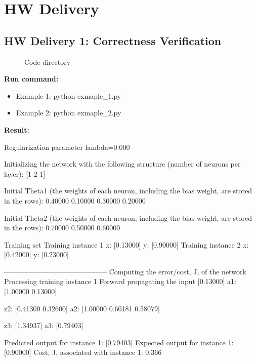 \documentclass{article}
\begin{document}
\newpage
\section*{HW Delivery}

\subsection*{HW Delivery 1: Correctness Verification}

\begin{figure}[htbp]
\centering
\begin{minipage}{0.95\linewidth}

\end{minipage}
\caption{Code directory}
\label{fig:filetree}
\end{figure}


\noindent \textbf{Run command:}
\begin{itemize}
    \item Example 1: python exmaple\_1.py
    \item Example 2: python exmaple\_2.py
\end{itemize}

\noindent \textbf{Result:}

\noindent {}

Regularization parameter lambda=0.000

Initializing the network with the following structure (number of neurons per layer): [1 2 1]

Initial Theta1 (the weights of each neuron, including the bias weight, are stored in the rows):
0.40000  0.10000
0.30000  0.20000

Initial Theta2 (the weights of each neuron, including the bias weight, are stored in the rows):
0.70000  0.50000  0.60000

Training set
Training instance 1
x: [0.13000]
y: [0.90000]
Training instance 2
x: [0.42000]
y: [0.23000]

--------------------------------------------
Computing the error/cost, J, of the network
Processing training instance 1
Forward propagating the input [0.13000]
a1: [1.00000   0.13000]

z2: [0.41300   0.32600]
a2: [1.00000   0.60181   0.58079]

z3: [1.34937]
a3: [0.79403]

Predicted output for instance 1: [0.79403]
Expected output for instance 1: [0.90000]
Cost, J, associated with instance 1: 0.366
\end{document}
